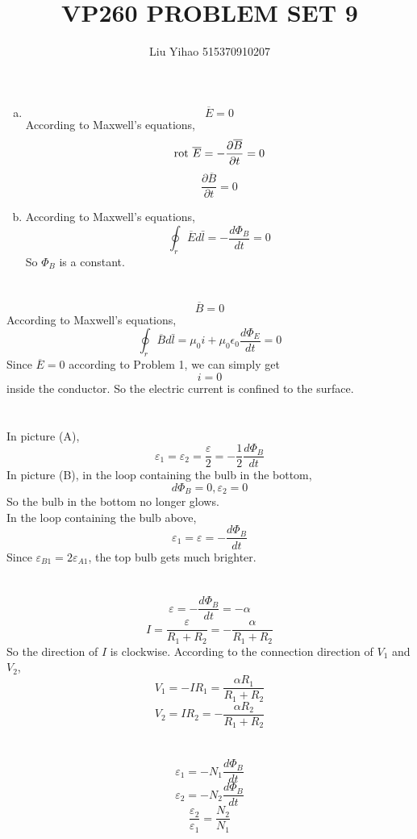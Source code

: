 \documentclass{article}
\title{VP260 PROBLEM SET 9}
\author{Liu Yihao 515370910207}
\date{}
\begin{document}
\maketitle

\section{}
\begin{enumerate}[(a)]
\item
$$\overline{E}=0$$
According to Maxwell's equations,
$${\rm rot\ }\overline{E}=-\frac{\partial\overline{B}}{\partial t}=0$$
$$\frac{\partial\overline{B}}{\partial t}=0$$
\item
According to Maxwell's equations,
$$\oint_r\overline{E}d\bar{l}=-\frac{d\Phi_B}{dt}=0$$
So $\Phi_B$ is a constant.
\end{enumerate}

\section{}
$$\overline{B}=0$$
According to Maxwell's equations,
$$\oint_r\overline{B}d\bar{l}=\mu_0i+\mu_0\epsilon_0\frac{d\Phi_E}{dt}=0$$
Since $\overline{E}=0$ according to Problem 1, we can simply get
$$i=0$$
inside the conductor. So the electric current is confined to the surface.

\section{}
In picture (A),
$$\varepsilon_1=\varepsilon_2=\frac{\varepsilon}{2}=-\frac{1}{2}\frac{d\Phi_B}{dt}$$
In picture (B), in the loop containing the bulb in the bottom,
$$d\Phi_B=0,\varepsilon_2=0$$
So the bulb in the bottom no longer glows.\\
In the loop containing the bulb above,
$$\varepsilon_1=\varepsilon=-\frac{d\Phi_B}{dt}$$
Since $\varepsilon_{B1}=2\varepsilon_{A1}$, the top bulb gets much brighter.

\section{}
$$\varepsilon=-\frac{d\Phi_B}{dt}=-\alpha$$
$$I=\frac{\varepsilon}{R_1+R_2}=-\frac{\alpha}{R_1+R_2}$$
So the direction of $I$ is clockwise.
According to the connection direction of $V_1$ and $V_2$,
$$V_1=-IR_1=\frac{\alpha R_1}{R_1+R_2}$$
$$V_2=IR_2=-\frac{\alpha R_2}{R_1+R_2}$$

\section{}
$$\varepsilon_1=-N_1\frac{d\Phi_B}{dt}$$
$$\varepsilon_2=-N_2\frac{d\Phi_B}{dt}$$
$$\frac{\varepsilon_2}{\varepsilon_1}=\frac{N_2}{N_1}$$
\end{document}
